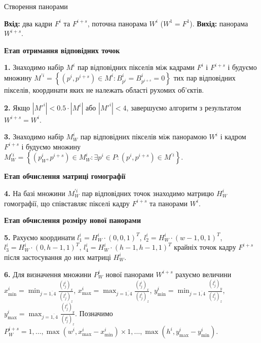 \begin{algorithm}[H]
    \caption{Створення панорами}
    \begin{algorithmic}
        \State \textbf{Вхід:} два кадри \(F^{i}\) та \(F^{i + s}\), поточна панорама \(W^{i}\) (\(W^{1} = F^{1}\)).
        \State \textbf{Вихід:} панорама \(W^{i + s}\).

        \textbf{Етап отримання відповідних точок}

        \textbf{1.} Знаходимо набір \(M^{i}\) пар відповідних пікселів між кадрами
        \(F^{i}\) і \(F^{i + s}\) і будуємо множину
        \(M^{'i} = \left\{ \left( p^{i},p^{i + s} \right) \in M^{i}:B_{p^{i}}^{i} = B_{p^{i + s}}^{i} = 0 \right\}\)
        тих пар відповідних пікселів, координати яких не належать області
        рухомих об'єктів.

        \textbf{2.}
        Якщо \(\left| {M'}^{i} \right| < 0.5 \cdot \left| M^{i} \right|\) або
        \(\left| {M'}^{i} \right| < 4\), завершуємо алгоритм з результатом
        \(W^{i + s} = W^{i}\).

        \textbf{3.}
        Знаходимо набір \(M_{W}^{i}\) пар відповідних пікселів між панорамою
        \(W^{i}\) і кадром \(F^{i + s}\) і будуємо множину
        \(M_{W}^{'i} = \left\{ \left( p_{W}^{i},p^{i + s} \right) \in M_{W}^{i}:\exists p^{i} \in P:\left( p^{i},p^{i + s} \right) \in M^{'i} \right\}\).
        
        \textbf{Етап обчислення матриці гомографії}

        \textbf{4.}
        На базі множини \(M_{W}^{'i}\) пар відповідних точок знаходимо матрицю
        \(H_{W}^{i}\) гомографії, що співставляє пікселі кадру \(F^{i + s}\)
        та панорами \(W^{i}\).

        \textbf{Етап обчислення розміру нової панорами}

        \textbf{5.}
        Рахуємо координати
        \(l_{1}^{i} = H_{W}^{i} \cdot (0,0,1)^{T}\),
        \(l_{2}^{i} = H_{W}^{i} \cdot (w - 1,0,1)^{T}\),
        \(l_{3}^{i} = H_{W}^{i} \cdot (0,h - 1,1)^{T}\),
        \(l_{4}^{i} = H_{W}^{i} \cdot (h - 1,h - 1,1)^{T}\) крайніх
        точок кадру \(F^{i + s}\) після застосування до них матриці
        \(H_{W}^{i}\).

        \textbf{6.}
        Для визначення множини \(P_{W}^{i}\) нової панорами \(W^{i + s}\)
        рахуємо величини
        \(x_{\min}^{i} = \min_{j = \overline{1,4}}\frac{( l_{j}^{i} )_{x}}{( l_{j}^{i} )_{z}}\),
        \(x_{\max}^{i} = \max_{j = \overline{1,4}}\frac{( l_{j}^{i} )_{x}}{( l_{j}^{i} )_{z}}\),
        \(y_{\min}^{i} = \min_{j = \overline{1,4}}\frac{( l_{j}^{i} )_{y}}{( l_{j}^{i} )_{z}}\),
        \(y_{\max}^{i} = \max_{j = \overline{1,4}}\frac{( l_{j}^{i} )_{y}}{( l_{j}^{i} )_{z}}\).
        Позначимо
        $P_{W}^{i + s} = 
        { 1,\ldots,\max( w^{i},x_{\max}^{i} - x_{\min}^{i} ) }
        \times 
        { 1,\ldots,\max( h^{i},y_{\max}^{i} - y_{\min}^{i} ) }$.


\end{algorithmic}
\end{algorithm}
